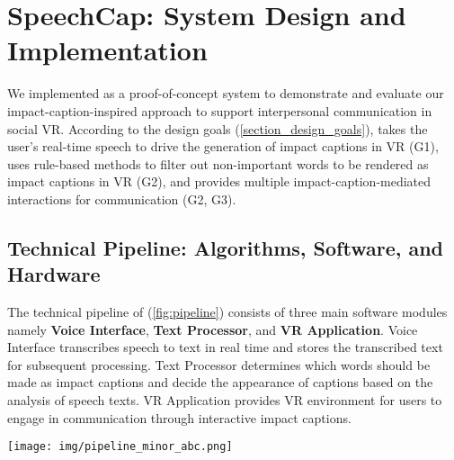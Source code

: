 \section{SpeechCap: System Design and Implementation}
We implemented \system{} as a proof-of-concept system to demonstrate and evaluate our impact-caption-inspired approach to support interpersonal communication in social VR. According to the design goals (\autoref{section_design_goals}), \system{} takes the user's real-time speech to drive the generation of impact captions in VR (G1), uses rule-based methods to filter out non-important words to be rendered as impact captions in VR (G2), and provides multiple impact-caption-mediated interactions for communication (G2, G3).


\subsection{Technical Pipeline: Algorithms, Software, and Hardware}
\label{sec_pipeline}
The technical pipeline of \system{} (\autoref{fig:pipeline}) consists of three main software modules namely \textbf{Voice Interface}, \textbf{Text Processor}, and \textbf{VR Application}.
Voice Interface transcribes speech to text in real time and stores the transcribed text for subsequent processing.
Text Processor determines which words should be made as impact captions and decide the appearance of captions based on the analysis of speech texts. VR Application provides VR environment for users to engage in communication through interactive impact captions.

\begin{figure*}[!ht]
    \centering
    \texttt{[image: img/pipeline\_minor\_abc.png]}
    \caption{
    }
    \label{fig:pipeline}
\end{figure*}


